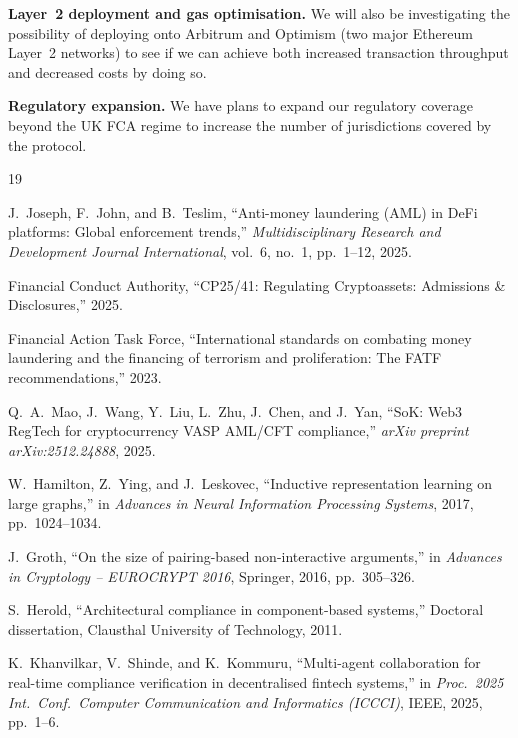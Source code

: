 \documentclass[journal]{IEEEtran}
\begin{document}
\textbf{Layer~2 deployment and gas optimisation.} We will also be investigating the possibility of deploying onto Arbitrum and Optimism (two major Ethereum Layer~2 networks) to see if we can achieve both increased transaction throughput and decreased costs by doing so.

\textbf{Regulatory expansion.} We have plans to expand our regulatory coverage beyond the UK FCA regime to increase the number of jurisdictions covered by the protocol.

\begin{thebibliography}{19}

J.~Joseph, F.~John, and B.~Teslim, ``Anti-money laundering (AML) in DeFi platforms: Global enforcement trends,'' \textit{Multidisciplinary Research and Development Journal International}, vol.~6, no.~1, pp.~1--12, 2025.

Financial Conduct Authority, ``CP25/41: Regulating Cryptoassets: Admissions \& Disclosures,'' 2025.

Financial Action Task Force, ``International standards on combating money laundering and the financing of terrorism and proliferation: The FATF recommendations,'' 2023.

Q.~A.~Mao, J.~Wang, Y.~Liu, L.~Zhu, J.~Chen, and J.~Yan, ``SoK: Web3 RegTech for cryptocurrency VASP AML/CFT compliance,'' \textit{arXiv preprint arXiv:2512.24888}, 2025.

W.~Hamilton, Z.~Ying, and J.~Leskovec, ``Inductive representation learning on large graphs,'' in \textit{Advances in Neural Information Processing Systems}, 2017, pp.~1024--1034.

J.~Groth, ``On the size of pairing-based non-interactive arguments,'' in \textit{Advances in Cryptology -- EUROCRYPT 2016}, Springer, 2016, pp.~305--326.

S.~Herold, ``Architectural compliance in component-based systems,'' Doctoral dissertation, Clausthal University of Technology, 2011.

K.~Khanvilkar, V.~Shinde, and K.~Kommuru, ``Multi-agent collaboration for real-time compliance verification in decentralised fintech systems,'' in \textit{Proc.\ 2025 Int.\ Conf.\ Computer Communication and Informatics (ICCCI)}, IEEE, 2025, pp.~1--6.


\end{thebibliography}
\end{document}
